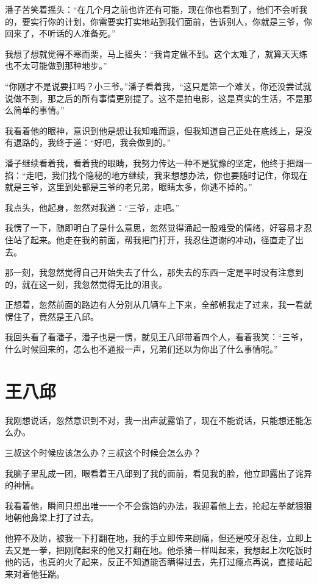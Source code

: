 潘子苦笑着摇头：“在几个月之前也许还有可能，现在你也看到了，他们不会听我的，要实行你的计划，你需要实打实地站到我们面前，告诉别人，你就是三爷，你回来了，不听话的人准备死。”

我想了想就觉得不寒而栗，马上摇头：“我肯定做不到。这个太难了，就算天天练也不太可能做到那种地步。”

“你刚才不是说要扛吗？小三爷。”潘子看着我，“这只是第一个难关，你还没尝试就说做不到，那之后的所有事情更别提了。这不是拍电影，这是真实的生活，不是那么简单的事情。”

我看着他的眼神，意识到他是想让我知难而退，但我知道自己正处在底线上，是没有退路的，我终于道：“好吧，我会做到的。”

潘子继续看着我，看着我的眼睛，我努力传达一种不是犹豫的坚定，他终于把烟一掐：“走吧，我们找个隐秘的地方继续，我来想想办法，你也要随时记住，你现在就是三爷，这里到处都是三爷的老兄弟，眼睛太多，你逃不掉的。”

我点头，他起身，忽然对我道：“三爷，走吧。”

我愣了一下，随即明白了是什么意思，忽然觉得涌起一股难受的情绪，好容易才忍住站了起来。他走在我的前面，帮我把门打开，我忍住道谢的冲动，径直走了出去。

那一刻，我忽然觉得自己开始失去了什么，那失去的东西一定是平时没有注意到的，就在这一刻，我忽然觉得无比的沮丧。

正想着，忽然前面的路边有人分别从几辆车上下来，全部朝我走了过来，我一看就愣住了，竟然是王八邱。

我回头看了看潘子，潘子也是一愣，就见王八邱带着四个人，看着我笑：“三爷，什么时候回来的，怎么也不通报一声，兄弟们还以为你出了什么事情呢。”

\chapter{王八邱}

我刚想说话，忽然意识到不对，我一出声就露馅了，现在不能说话，只能想还能怎么办。

三叔这个时候应该怎么办？三叔这个时候会怎么办？

我脑子里乱成一团，眼看着王八邱到了我的面前，看见我的脸，他立即露出了诧异的神情。

我看着他，瞬间只想出唯一一个不会露馅的办法，我迎着他上去，抡起左拳就狠狠地朝他鼻梁上打了过去。

他猝不及防，被我一下打翻在地，我的手立即传来剧痛，但还是咬牙忍住，立即上去又是一拳，把刚爬起来的他又打翻在地。他杀猪一样叫起来，我想起上次吃饭时他的话，也真的火了起来，反正不知道能否瞒得过去，先打过瘾点再说，直接站起来对着他狂踹。


